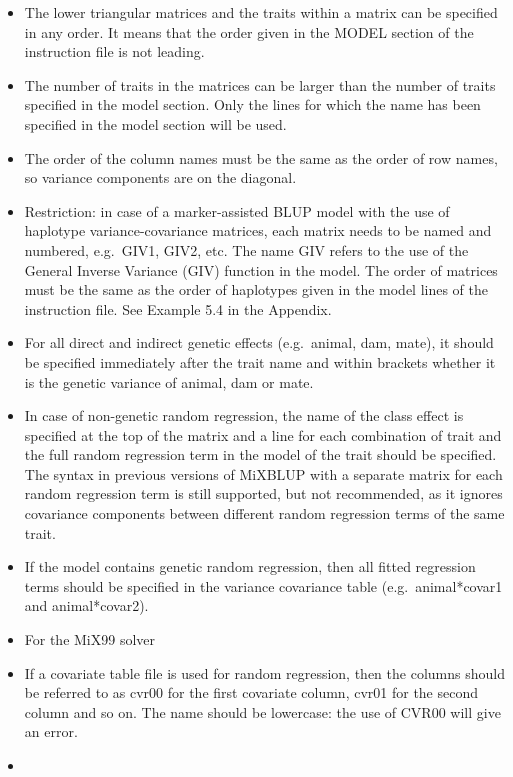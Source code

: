\begin{itemize}
\tightlist
\item
  The lower triangular matrices and the traits within a matrix can be
  specified in any order. It means that the order given in the MODEL
  section of the instruction file is not leading.
\item
  The number of traits in the matrices can be larger than the number of
  traits specified in the model section. Only the lines for which the
  name has been specified in the model section will be used.
\item
  The order of the column names must be the same as the order of row
  names, so variance components are on the diagonal.
\item
  Restriction: in case of a marker-assisted BLUP model with the use of
  haplotype variance-covariance matrices, each matrix needs to be named
  and numbered, e.g.~GIV1, GIV2, etc. The name GIV refers to the use of
  the General Inverse Variance (GIV) function in the model. The order of
  matrices must be the same as the order of haplotypes given in the
  model lines of the instruction file. See Example 5.4 in the Appendix.
\item
  For all direct and indirect genetic effects (e.g.~animal, dam, mate),
  it should be specified immediately after the trait name and within
  brackets whether it is the genetic variance of animal, dam or mate.
\item
  In case of non-genetic random regression, the name of the class effect
  is specified at the top of the matrix and a line for each combination
  of trait and the full random regression term in the model of the trait
  should be specified. The syntax in previous versions of MiXBLUP with a
  separate matrix for each random regression term is still supported,
  but not recommended, as it ignores covariance components between
  different random regression terms of the same trait.
\item
  If the model contains genetic random regression, then all fitted
  regression terms should be specified in the variance covariance table
  (e.g.~animal*covar1 and animal*covar2).
\item
  For the MiX99 solver
\item
  If a covariate table file is used for random regression, then the
  columns should be referred to as cvr00 for the first covariate column,
  cvr01 for the second column and so on. The name should be lowercase:
  the use of CVR00 will give an error.
\item

\end{itemize}
